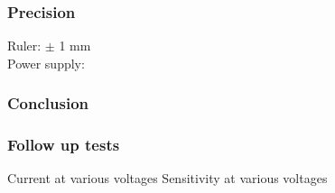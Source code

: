 \subsubsection{Precision}
Ruler: $ \pm $ 1 mm\\
Power supply:

\subsubsection{Conclusion}


\subsubsection{Follow up tests}

Current at various voltages
Sensitivity at various voltages